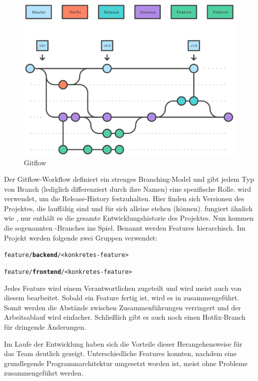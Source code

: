 \begin{figure}[h]
	\includegraphics[width=\columnwidth]{img/gitflow}
	\caption[Gitflow]{Gitflow\footnotemark}
\end{figure}

Der Gitflow-Workflow definiert ein strenges Branching-Model und gibt jedem Typ von Branch (lediglich differenziert durch ihre Namen) eine spezifische Rolle.  wird verwendet, um die Release-History festzuhalten. Hier finden sich Versionen des Projektes, die lauffähig sind und für sich alleine stehen (können).  fungiert ähnlich wie , nur enthält es die gesamte Entwicklungshistorie des Projektes. Nun kommen die sogenannten -Branches ins Spiel. Benannt werden Features hierarchisch. Im Projekt werden folgende zwei Gruppen verwendet: 

\begin{minipage}{\textwidth}
	\texttt{feature/\textbf{backend}/<konkretes-feature>}
	
	\texttt{feature/\textbf{frontend}/<konkretes-feature>}
\end{minipage}

Jedes Feature wird einem Verantwortlichen zugeteilt und wird meist auch von diesem bearbeitet. Sobald ein Feature fertig ist, wird es in  zusammengeführt. Somit werden die Abstände zwischen Zusammenführungen verringert und der Arbeitsablauf wird einfacher. Schließlich gibt es auch noch einen Hotfix-Branch für dringende Änderungen.

Im Laufe der Entwicklung haben sich die Vorteile dieser Herangehensweise für das Team deutlich gezeigt. Unterschiedliche Features konnten, nachdem eine grundlegende Programmarchitektur umgesetzt worden ist, meist ohne Probleme zusammengeführt werden. 

